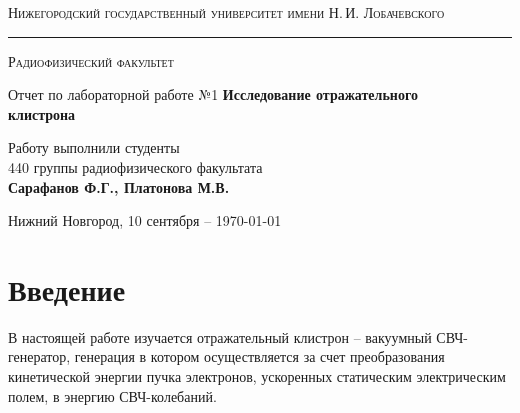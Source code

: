 \documentclass[a4paper,14pt]{extarticle}
\def\labauthors{Сарафанов Ф.Г., Платонова М.В.}
\def\labnumber{1}
\begin{document}
\begin{titlepage}
\begin{center}
{\small\textsc{Нижегородский государственный университет имени Н.\,И. Лобачевского}}
\vskip 2pt \hrule \vskip 3pt
{\small\textsc{Радиофизический факультет}}

\vfill


{{\large Отчет по лабораторной работе №\labnumber}\vskip 12pt {\LARGE \bfseries Исследование отражательного\\[0.2em] клистрона}}

	
\vspace{2cm}
{\large Работу выполнили студенты \\[-0.25em] 440 группы радиофизического факультата \\[0.5em] {\Large \bfseries \labauthors}}



\end{center}

\vfill
	
	
	
\begin{center}
	{Нижний Новгород, 10 сентября -- \today}
\end{center}

\end{titlepage}
\tableofcontents
\newpage



\section*{Введение}

В настоящей работе изучается отражательный клистрон -- вакуумный СВЧ-генератор, генерация в котором осуществляется за счет преобразования кинетической энергии пучка электронов, ускоренных статическим электрическим полем, в энергию СВЧ-колебаний. 
\end{document}
